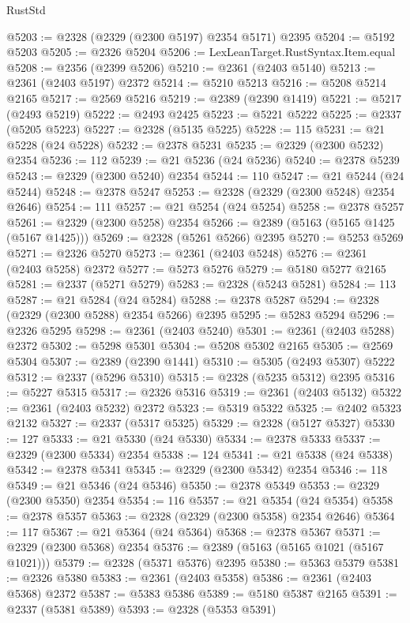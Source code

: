 \begin{lexlean}{RustStd}
\begin{coremodule}
@5203 := @2328 (@2329 (@2300 @5197) @2354 @5171) @2395
@5204 := @5192 @5203
@5205 := @2326 @5204
@5206 := LexLeanTarget.RustSyntax.Item.equal
@5208 := @2356 (@2399 @5206)
@5210 := @2361 (@2403 @5140)
@5213 := @2361 (@2403 @5197) @2372
@5214 := @5210 @5213
@5216 := @5208 @5214 @2165
@5217 := @2569 @5216
@5219 := @2389 (@2390 @1419)
@5221 := @5217 (@2493 @5219)
@5222 := @2493 @2425
@5223 := @5221 @5222
@5225 := @2337 (@5205 @5223)
@5227 := @2328 (@5135 @5225)
@5228 := 115
@5231 := @21 @5228 (@24 @5228)
@5232 := @2378 @5231
@5235 := @2329 (@2300 @5232) @2354
@5236 := 112
@5239 := @21 @5236 (@24 @5236)
@5240 := @2378 @5239
@5243 := @2329 (@2300 @5240) @2354
@5244 := 110
@5247 := @21 @5244 (@24 @5244)
@5248 := @2378 @5247
@5253 := @2328 (@2329 (@2300 @5248) @2354 @2646)
@5254 := 111
@5257 := @21 @5254 (@24 @5254)
@5258 := @2378 @5257
@5261 := @2329 (@2300 @5258) @2354
@5266 := @2389 (@5163 (@5165 @1425 (@5167 @1425)))
@5269 := @2328 (@5261 @5266) @2395
@5270 := @5253 @5269
@5271 := @2326 @5270
@5273 := @2361 (@2403 @5248)
@5276 := @2361 (@2403 @5258) @2372
@5277 := @5273 @5276
@5279 := @5180 @5277 @2165
@5281 := @2337 (@5271 @5279)
@5283 := @2328 (@5243 @5281)
@5284 := 113
@5287 := @21 @5284 (@24 @5284)
@5288 := @2378 @5287
@5294 := @2328 (@2329 (@2300 @5288) @2354 @5266) @2395
@5295 := @5283 @5294
@5296 := @2326 @5295
@5298 := @2361 (@2403 @5240)
@5301 := @2361 (@2403 @5288) @2372
@5302 := @5298 @5301
@5304 := @5208 @5302 @2165
@5305 := @2569 @5304
@5307 := @2389 (@2390 @1441)
@5310 := @5305 (@2493 @5307) @5222
@5312 := @2337 (@5296 @5310)
@5315 := @2328 (@5235 @5312) @2395
@5316 := @5227 @5315
@5317 := @2326 @5316
@5319 := @2361 (@2403 @5132)
@5322 := @2361 (@2403 @5232) @2372
@5323 := @5319 @5322
@5325 := @2402 @5323 @2132
@5327 := @2337 (@5317 @5325)
@5329 := @2328 (@5127 @5327)
@5330 := 127
@5333 := @21 @5330 (@24 @5330)
@5334 := @2378 @5333
@5337 := @2329 (@2300 @5334) @2354
@5338 := 124
@5341 := @21 @5338 (@24 @5338)
@5342 := @2378 @5341
@5345 := @2329 (@2300 @5342) @2354
@5346 := 118
@5349 := @21 @5346 (@24 @5346)
@5350 := @2378 @5349
@5353 := @2329 (@2300 @5350) @2354
@5354 := 116
@5357 := @21 @5354 (@24 @5354)
@5358 := @2378 @5357
@5363 := @2328 (@2329 (@2300 @5358) @2354 @2646)
@5364 := 117
@5367 := @21 @5364 (@24 @5364)
@5368 := @2378 @5367
@5371 := @2329 (@2300 @5368) @2354
@5376 := @2389 (@5163 (@5165 @1021 (@5167 @1021)))
@5379 := @2328 (@5371 @5376) @2395
@5380 := @5363 @5379
@5381 := @2326 @5380
@5383 := @2361 (@2403 @5358)
@5386 := @2361 (@2403 @5368) @2372
@5387 := @5383 @5386
@5389 := @5180 @5387 @2165
@5391 := @2337 (@5381 @5389)
@5393 := @2328 (@5353 @5391)

\end{coremodule}
\end{lexlean}
